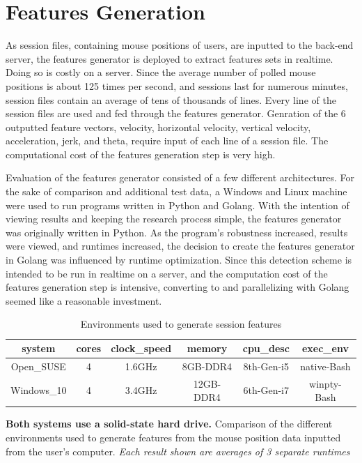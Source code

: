 
\section{Features Generation}\label{sec:evaluation-features-generation}
As session files, containing mouse positions of users, are inputted to the back-end server, the features generator is deployed to extract features sets in realtime. Doing so is costly on a server. Since the average number of polled mouse positions is about 125 times per second, and sessions last for numerous minutes, session files contain an average of tens of thousands of lines. Every line of the session files are used and fed through the features generator. Genration of the 6 outputted feature vectors, velocity, horizontal velocity, vertical velocity, acceleration, jerk, and theta, require input of each line of a session file. The computational cost of the features generation step is very high.

Evaluation of the features generator consisted of a few different architectures. For the sake of comparison and additional test data, a Windows and Linux machine were used to run programs written in Python and Golang. With the intention of viewing results and keeping the research process simple, the features generator was originally written in Python. As the program's robustness increased, results were viewed, and runtimes increased, the decision to create the features generator in Golang was influenced by runtime optimization. Since this detection scheme is intended to be run in realtime on a server, and the computation cost of the features generation step is intensive, converting to and parallelizing with Golang seemed like a reasonable investment.

\begin{table}[h!]
    \centering
    \begin{tabular}{ |c|c|c|c|c|c| }
        \hline
        \textbf{system} & \textbf{cores} & \textbf{clock{\_}speed} & \textbf{memory} & \textbf{cpu{\_}desc} & \textbf{exec{\_}env} \\
        \hline
        Open{\_}SUSE & 4 & 1.6GHz & 8GB-DDR4 & 8th-Gen-i5 & native-Bash \\
        Windows{\_}10 & 4 & 3.4GHz & 12GB-DDR4 & 6th-Gen-i7 & winpty-Bash \\
        \hline
    \end{tabular}
    \caption{Environments used to generate session features}
    {\small \textbf{Both systems use a solid-state hard drive.} Comparison of the different environments used to generate features from the mouse position data inputted from the user's computer. \textit{Each result shown are averages of 3 separate runtimes}}
\end{table}

